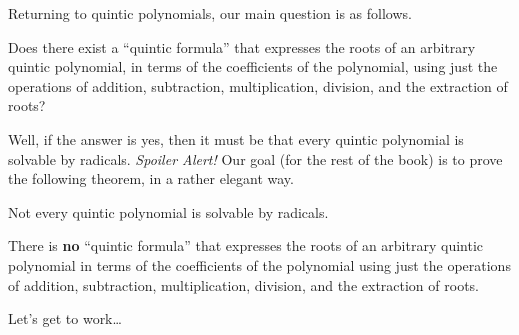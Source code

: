Returning to quintic polynomials, our main question is as follows.

\begin{mainquestion} 
Does there exist a ``quintic formula'' that expresses the roots of an arbitrary quintic polynomial, in terms of the coefficients of the polynomial, using just the operations of addition, subtraction, multiplication, division, and the extraction of roots?
\end{mainquestion}

Well, if the answer is yes, then it must be that every quintic polynomial is solvable by radicals. \textit{Spoiler Alert!}  Our goal (for the rest of the book) is to prove the following theorem, in a rather elegant way. 

\begin{maintheorem}\label{thm.MainTheorem}
Not every quintic polynomial is solvable by radicals.
\end{maintheorem}

\begin{maincorollary}
There is \textbf{no} ``quintic formula'' that expresses the roots of an arbitrary quintic polynomial in terms of the coefficients of the polynomial using just the operations of addition, subtraction, multiplication, division, and the extraction of roots.
\end{maincorollary}

\vfill

\begin{flushright}
Let's get to work\dots
\end{flushright}